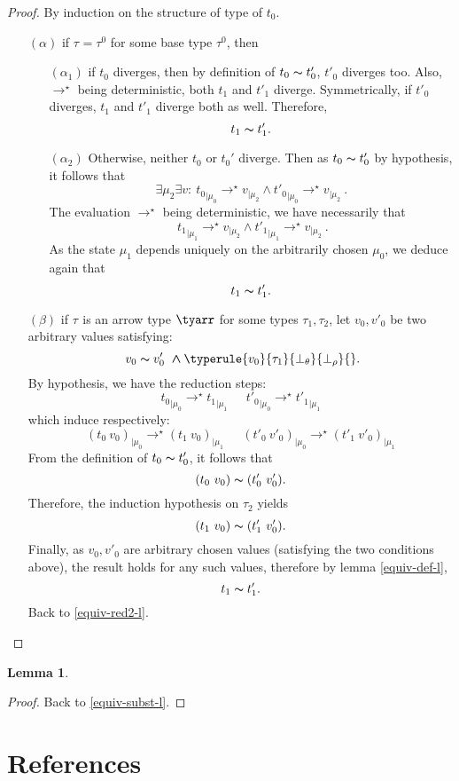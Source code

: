 \documentclass[a4paper,11pt,oneside]{article}
\theoremstyle{plain}
\newtheorem{lemma}[definition]{Lemma}
\newcommand{\tmapp}[2]{(#1 ~ #2)}
\newcommand{\ty}[1][]{\tau_{#1}}
\newcommand{\bwedge}{\boldsymbol{\wedge}}
\newcommand{\evalstar}[4]{~#1_{|\mu_#2} \rightarrow^{\star} #3_{|\mu_#4} ~}
\newcommand{\eqv}[1]{#1 \thicksim #1'}
\begin{document}
	\begin{proof}
		By induction on the structure of type of $t_0$. 
		\begin{itemize}
		\item[$(\alpha)$] if $\ty = \ty^0$ for some base type $\ty^0$, then
		
			\begin{itemize}
			\item[$(\alpha_1)$] if $t_0$ diverges, then by definition of 
			$\eqv{t_0}$, $t'_0$ diverges too. Also, $\rightarrow^\star$ being 
			deterministic, both $t_1$ and $t'_1$ diverge. Symmetrically, if 
			$t'_0$ diverges, $t_1$ and $t'_1$ diverge both as well. Therefore,
			$$\eqv{t_1}.$$
						
			\item[$(\alpha_2)$] Otherwise, neither $t_0$ or $t_{0}'$ diverge. Then
				as $\eqv{t_0}$ by hypothesis, it follows that 
					$$ \exists \mu_2 \exists v: 
					\evalstar{{t_0}}{0}{v}{2} \bwedge \evalstar{{t'_0}}{0}{v}{2}.$$
				The evaluation $\rightarrow^\star$ being deterministic, we have 
				necessarily that
					$$\evalstar{{t_1}}{1}{v}{2} \bwedge \evalstar{{t'_1}}{1}{v}{2}.$$
				As the state $\mu_1$ depends uniquely on the arbitrarily chosen 
				$\mu_0$, we deduce again that $$\eqv{t_1}.$$					
			\end{itemize}			
			
		\item[$(\beta)$] if $\ty$ is an arrow type $\tyarr$ for some types 
		$\ty[1], \ty[2]$,	let $v_0, v'_0$ be two arbitrary values satisfying:
		$$~\eqv{v_0}~\bwedge \typerule{v_0}{\ty[1]}{\bot_\theta}{\bot_\rho}{}.$$
		By hypothesis, we have the reduction steps:
		$$\evalstar{{t_0}}{0}{{t_1}}{1}\quad\evalstar{{t'_0}}{0}{{t'_1}}{1}$$						which induce respectively: 
		$$\evalstar{\tmapp{t_0}{v_0}}{0}{\tmapp{t_1}{v_0}}{1} \quad
		\evalstar{\tmapp{t'_0}{v'_0}}{0}{\tmapp{t'_1}{v'_0}}{1}$$	
		From the definition of $\eqv{t_0}$, it follows that
		$${\tmapp{t_0}{v_0}} \thicksim {\tmapp{t'_0}{v'_0}}.$$
		Therefore, the induction hypothesis on $\ty[2]$ yields 
		$${\tmapp{t_1}{v_0}}\thicksim{\tmapp{t'_1}{v'_0}}.$$
		Finally, as $v_0, v'_0$ are arbitrary chosen values (satisfying the
		two conditions above), the result holds for any such values, 
		therefore by lemma \ref{equiv-def-l},
		$$\eqv{t_1}.$$ Back to \ref{equiv-red2-l}.	
		\end{itemize}	
	\end{proof}		

	\begin{lemma}

	\label{equiv-subst-p}
	\end{lemma}

	\begin{proof}
	Back to \ref{equiv-subst-l}.
	\end{proof}
	
\newpage
\section{References} 


\end{document}
